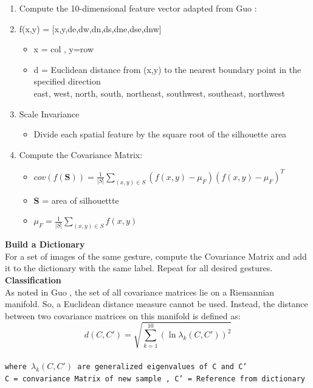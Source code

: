 \begin{enumerate}
    \item Compute the 10-dimensional feature vector adapted from Guo \cite{21} : 
    
    \item f(x,y) = [x,y,de,dw,dn,ds,dne,dse,dnw]
    \begin{itemize}
        \item x = col , y=row
        \item d =  Euclidean distance from (x,y) to the nearest boundary point in the specified
direction \\
east, west, north, south, northeast, southwest, southeast, northwest
    \end{itemize}
    \item Scale Invariance 
    \begin{itemize}
        \item Divide each spatial feature by the square root of the silhouette area
     
    \end{itemize}
    \item Compute the Covariance Matrix: 
    \begin{itemize}
        \item $cov(f(\textbf{S}))=\frac{1}{|S|}\sum_{(x,y) \in S }(f(x,y)-\mu_{F})(f(x,y)-\mu_{F})^{T}$
        \item \textbf{S} = area of silhouettte 
        \item $\mu_{F} = \frac{1}{|S|}\sum_{(x,y) \in S } f(x,y) $
    \end{itemize}
    
\end{enumerate}
\textbf{Build a Dictionary }\\
For a set of images of the same gesture, compute the Covariance Matrix and add it to
the dictionary with the same label. Repeat for all desired gestures.\\
\textbf{Classification }\\
As noted in Guo \cite{21}, the set of all covariance matrices lie on a Riemannian
manifold. So, a Euclidean distance measure cannot be used. Instead, the distance
between two covariance matrices on this manifold is defined as:\\
$$d(C,C') = \sqrt{\sum_{k=1}^{10} (\ln \lambda_{k}(C,C'))^{2}}$$ \\
\texttt{where $\lambda_{k}(C,C')$ are generalized eigenvalues of C and C'\\
C = convariance Matrix of new sample ,  C' = Reference from dictionary  } \\

